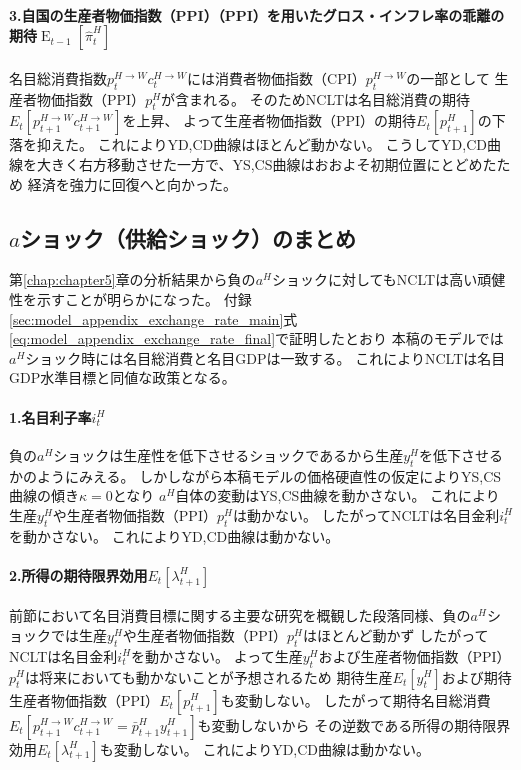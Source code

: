 \paragraph{3.自国の生産者物価指数（PPI）（PPI）を用いたグロス・インフレ率の乖離の期待\(\operatorname{E}_{t-1}[\hat{\pi}_t^H]\)}
\label{sec:discussion_as_ad_beta_shock_ppi}
名目総消費指数\(p_t^{H\to W}c_t^{H\to W}\)には消費者物価指数（CPI）\(p_t^{H\to W}\)の一部として
生産者物価指数（PPI）\(p_t^H\)が含まれる。
そのためNCLTは名目総消費の期待\(E_t[p_{t+1}^{H\to W}c_{t+1}^{H\to W}]\)を上昇、
よって生産者物価指数（PPI）の期待\(E_t[p_{t+1}^H]\)の下落を抑えた。
これによりYD,CD曲線はほとんど動かない。
こうしてYD,CD曲線を大きく右方移動させた一方で、YS,CS曲線はおおよそ初期位置にとどめたため
経済を強力に回復へと向かった。

\subsection{\(a\)ショック（供給ショック）のまとめ}
\label{sec:discussion_as_ad_a_shock}
第\ref{chap:chapter5}章の分析結果から負の\(a^H\)ショックに対してもNCLTは高い頑健性を示すことが明らかになった。
付録\ref{sec:model_appendix_exchange_rate_main}式\eqref{eq:model_appendix_exchange_rate_final}で証明したとおり
本稿のモデルでは\(a^H\)ショック時には名目総消費と名目GDPは一致する。
これによりNCLTは名目GDP水準目標と同値な政策となる。
\paragraph{1.名目利子率\(i_t^H\)}\label{sec:discussion_as_ad_a_shock_interest}
負の\(a^H\)ショックは生産性を低下させるショックであるから生産\(y_t^H\)を低下させるかのようにみえる。
しかしながら本稿モデルの価格硬直性の仮定によりYS,CS曲線の傾き\(\kappa=0\)となり
\(a^H\)自体の変動はYS,CS曲線を動かさない。
これにより生産\(y_t^H\)や生産者物価指数（PPI）\(p_t^H\)は動かない。
したがってNCLTは名目金利\(i_t^H\)を動かさない。
これによりYD,CD曲線は動かない。
\paragraph{2.所得の期待限界効用\(E_t[\lambda_{t+1}^H]\)}\label{sec:discussion_as_ad_a_shock_mu}
前節において名目消費目標に関する主要な研究を概観した段落同様、負の\(a^H\)ショックでは生産\(y_t^H\)や生産者物価指数（PPI）\(p_t^H\)はほとんど動かず
したがってNCLTは名目金利\(i_t^H\)を動かさない。
よって生産\(y_t^H\)および生産者物価指数（PPI）\(p_t^H\)は将来においても動かないことが予想されるため
期待生産\(E_t[y_t^H]\)および期待生産者物価指数（PPI）\(E_t[p_{t+1}^H]\)も変動しない。
したがって期待名目総消費\(E_t[p_{t+1}^{H\to W}c_{t+1}^{H\to W}=\bar{p}_{t+1}^Hy_{t+1}^H]\)も変動しないから
その逆数である所得の期待限界効用\(E_t[\lambda_{t+1}^H]\)も変動しない。
これによりYD,CD曲線は動かない。
